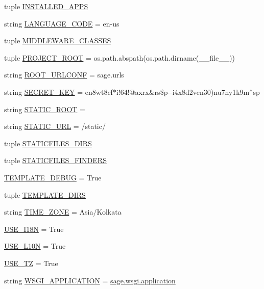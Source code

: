 \begin{DoxyCompactItemize}
\item 
tuple \hyperlink{a00043_af48e999a4a4e7f8830d84ac4eb08df1a}{I\+N\+S\+T\+A\+L\+L\+E\+D\+\_\+\+A\+P\+P\+S}
\item 
string \hyperlink{a00043_ac5b7a49ef37a25508ecb84453063821a}{L\+A\+N\+G\+U\+A\+G\+E\+\_\+\+C\+O\+D\+E} = \textquotesingle{}en-\/us\textquotesingle{}
\item 
tuple \hyperlink{a00043_a247a0ea3c79f999897dbfaed3bc99b1d}{M\+I\+D\+D\+L\+E\+W\+A\+R\+E\+\_\+\+C\+L\+A\+S\+S\+E\+S}
\item 
tuple \hyperlink{a00043_ae2e71004e0684c0243b4e9792726cd0f}{P\+R\+O\+J\+E\+C\+T\+\_\+\+R\+O\+O\+T} = os.\+path.\+abspath(os.\+path.\+dirname(\+\_\+\+\_\+file\+\_\+\+\_\+))
\item 
string \hyperlink{a00043_a92b3d804acae3871a9877ad143df4201}{R\+O\+O\+T\+\_\+\+U\+R\+L\+C\+O\+N\+F} = \textquotesingle{}sage.\+urls\textquotesingle{}
\item 
string \hyperlink{a00043_acc7cb44e3d92fc1334c19318ede49bc8}{S\+E\+C\+R\+E\+T\+\_\+\+K\+E\+Y} = \textquotesingle{}en8wt8cf$\ast$i!64!@axrx\&rs\$p-\/-\/i4x8d2ven30)nu7ny1k9m$^\wedge$sp\textquotesingle{}
\item 
string \hyperlink{a00043_a91b967847aecdd4d0edfbb0229656929}{S\+T\+A\+T\+I\+C\+\_\+\+R\+O\+O\+T} = \textquotesingle{}\textquotesingle{}
\item 
string \hyperlink{a00043_a0b4647cdde23eaed09c255182a9f576c}{S\+T\+A\+T\+I\+C\+\_\+\+U\+R\+L} = \textquotesingle{}/static/\textquotesingle{}
\item 
tuple \hyperlink{a00043_ac4ae870dea0d58410747ddcbdff2b3d7}{S\+T\+A\+T\+I\+C\+F\+I\+L\+E\+S\+\_\+\+D\+I\+R\+S}
\item 
tuple \hyperlink{a00043_af629022b1da961fa9828f450bc80bd22}{S\+T\+A\+T\+I\+C\+F\+I\+L\+E\+S\+\_\+\+F\+I\+N\+D\+E\+R\+S}
\item 
\hyperlink{a00043_a74c98bee40b9b06d51e44be6df73eb46}{T\+E\+M\+P\+L\+A\+T\+E\+\_\+\+D\+E\+B\+U\+G} = True
\item 
tuple \hyperlink{a00043_addc90c15790d385d304972f1b3098a86}{T\+E\+M\+P\+L\+A\+T\+E\+\_\+\+D\+I\+R\+S}
\item 
string \hyperlink{a00043_a07421ef620becc4c93753901abdf83c0}{T\+I\+M\+E\+\_\+\+Z\+O\+N\+E} = \textquotesingle{}Asia/Kolkata\textquotesingle{}
\item 
\hyperlink{a00043_acf5dd02a352695a98f57bef7679a29af}{U\+S\+E\+\_\+\+I18\+N} = True
\item 
\hyperlink{a00043_a9d0e7298d4688c99e0ee9e965d950de0}{U\+S\+E\+\_\+\+L10\+N} = True
\item 
\hyperlink{a00043_aa385f778cd7bd79cc4c688fec7c101a2}{U\+S\+E\+\_\+\+T\+Z} = True
\item 
string \hyperlink{a00043_a700b653427cc28bc1ebe951b419cfd58}{W\+S\+G\+I\+\_\+\+A\+P\+P\+L\+I\+C\+A\+T\+I\+O\+N} = \textquotesingle{}\hyperlink{a00045_a1ddb23bace7377dbda42c61a804bb9aa}{sage.\+wsgi.\+application}\textquotesingle{}
\end{DoxyCompactItemize}


